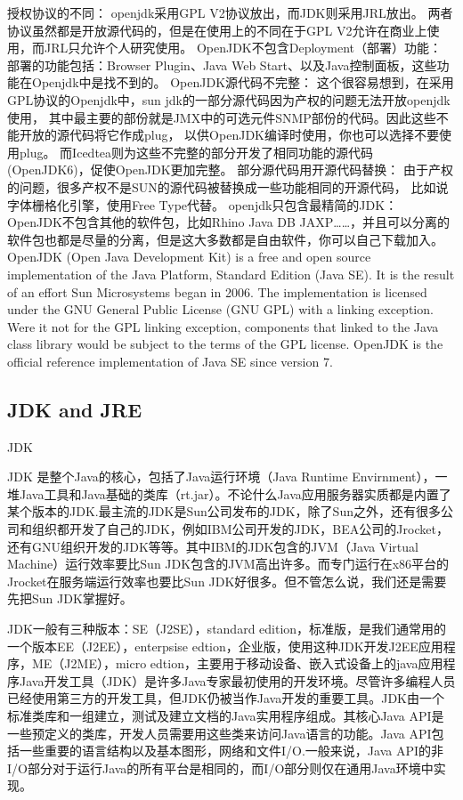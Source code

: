 \documentclass{book}
\begin{document}
授权协议的不同：
openjdk采用GPL V2协议放出，而JDK则采用JRL放出。
两者协议虽然都是开放源代码的，但是在使用上的不同在于GPL V2允许在商业上使用，而JRL只允许个人研究使用。
OpenJDK不包含Deployment（部署）功能：
部署的功能包括：Browser Plugin、Java Web Start、以及Java控制面板，这些功能在Openjdk中是找不到的。
OpenJDK源代码不完整：
这个很容易想到，在采用GPL协议的Openjdk中，sun jdk的一部分源代码因为产权的问题无法开放openjdk使用，
其中最主要的部份就是JMX中的可选元件SNMP部份的代码。因此这些不能开放的源代码将它作成plug，
以供OpenJDK编译时使用，你也可以选择不要使用plug。
而Icedtea则为这些不完整的部分开发了相同功能的源代码(OpenJDK6)，促使OpenJDK更加完整。
部分源代码用开源代码替换：
由于产权的问题，很多产权不是SUN的源代码被替换成一些功能相同的开源代码，
比如说字体栅格化引擎，使用Free Type代替。
openjdk只包含最精简的JDK：
OpenJDK不包含其他的软件包，比如Rhino Java DB JAXP……，并且可以分离的软件包也都是尽量的分离，但是这大多数都是自由软件，你可以自己下载加入。 
OpenJDK (Open Java Development Kit) is a free and open source 
implementation of the Java Platform, Standard Edition (Java SE).
It is the result of an effort Sun Microsystems began in 2006. 
The implementation is licensed under the GNU General Public 
License (GNU GPL) with a linking exception. 
Were it not for the GPL linking exception, 
components that linked to the Java class library would be subject 
to the terms of the GPL license. 
OpenJDK is the official reference implementation of Java SE since version 7.

\subsection{JDK and JRE}

JDK

JDK 是整个Java的核心，包括了Java运行环境（Java Runtime Envirnment），一堆Java工具和Java基础的类库（rt.jar）。不论什么Java应用服务器实质都是内置了某个版本的JDK.最主流的JDK是Sun公司发布的JDK，除了Sun之外，还有很多公司和组织都开发了自己的JDK，例如IBM公司开发的JDK，BEA公司的Jrocket，还有GNU组织开发的JDK等等。其中IBM的JDK包含的JVM（Java Virtual Machine）运行效率要比Sun JDK包含的JVM高出许多。而专门运行在x86平台的Jrocket在服务端运行效率也要比Sun JDK好很多。但不管怎么说，我们还是需要先把Sun JDK掌握好。

JDK一般有三种版本：SE（J2SE），standard edition，标准版，是我们通常用的一个版本EE（J2EE），enterpsise edtion，企业版，使用这种JDK开发J2EE应用程序，ME（J2ME），micro edtion，主要用于移动设备、嵌入式设备上的java应用程序Java开发工具（JDK）是许多Java专家最初使用的开发环境。尽管许多编程人员已经使用第三方的开发工具，但JDK仍被当作Java开发的重要工具。JDK由一个标准类库和一组建立，测试及建立文档的Java实用程序组成。其核心Java API是一些预定义的类库，开发人员需要用这些类来访问Java语言的功能。Java API包括一些重要的语言结构以及基本图形，网络和文件I/O.一般来说，Java API的非I/O部分对于运行Java的所有平台是相同的，而I/O部分则仅在通用Java环境中实现。
\end{document}
